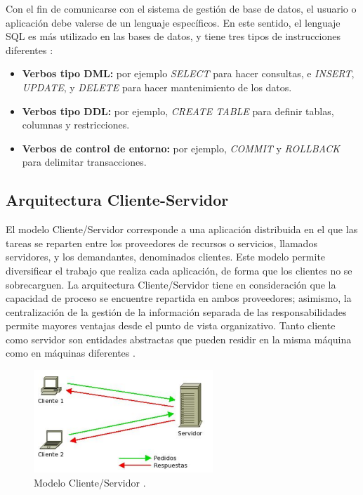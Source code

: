 Con el fin de comunicarse con el sistema de gestión de base de datos, el usuario o aplicación debe valerse de un lenguaje específicos. En este sentido, el lenguaje SQL es más utilizado en las bases de datos, y tiene tres tipos de instrucciones diferentes \parencite{camps2005}:

\begin{itemize}
\item \textbf{Verbos tipo DML:} por ejemplo \textit{SELECT} para hacer consultas, e \textit{INSERT}, \textit{UPDATE}, y \textit{DELETE} para hacer mantenimiento de los datos.
\item \textbf{Verbos tipo DDL:} por ejemplo, \textit{CREATE TABLE} para definir tablas, columnas y restricciones.
\item \textbf{Verbos de control de entorno:} por ejemplo, \textit{COMMIT} y \textit{ROLLBACK} para delimitar transacciones.
\end{itemize}

\subsection{Arquitectura Cliente-Servidor}

El modelo Cliente/Servidor corresponde a una aplicación distribuida en el que las tareas se reparten entre los proveedores de recursos o servicios, llamados servidores, y los demandantes, denominados clientes. Este modelo permite diversificar el trabajo que realiza cada aplicación, de forma que los clientes no se sobrecarguen. La arquitectura Cliente/Servidor tiene en consideración que la capacidad de proceso se encuentre repartida en ambos proveedores; asimismo, la centralización de la gestión de la información separada de las responsabilidades permite mayores ventajas desde el punto de vista organizativo. Tanto cliente como servidor son entidades abstractas que pueden residir en la misma máquina como en máquinas diferentes \parencite{marini2012}.

\begin{figure}[H]
\centering
\includegraphics[scale=1]{images/clienteservidor.png}
\caption{Modelo Cliente/Servidor \parencite{marini2012}.}
\end{figure}

